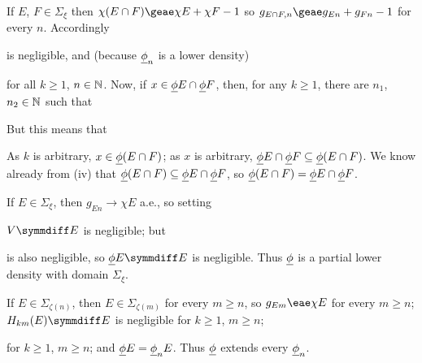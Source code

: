{\medskip

 If $E$, $F\in\Sigma_{\xi}$ then
$\chi(E\cap F)\geae\chi E+\chi F-1$ so
$g_{E\cap F,n}\geae g_{En}+g_{Fn}-1$ for every $n$.   Accordingly


\noindent is negligible, and (because ${\underline{\phi}}_n$ is a lower density)


\noindent for all $k\ge 1$, $n\in\Bbb N$.   Now, if $x\in{\underline{\phi}}
E\cap{\underline{\phi}} F$, then, for any $k\ge 1$, there are $n_1$, $n_2\in\Bbb
N$ such that


\noindent But this means that


\noindent As $k$ is arbitrary, $x\in{\underline{\phi}} (E\cap F)$;  as $x$ is
arbitrary, ${\underline{\phi}} E\cap{\underline{\phi}} F\subseteq{\underline{\phi}}(E\cap F)$.
We know already from (iv) that ${\underline{\phi}}(E\cap F)\subseteq{\underline{\phi}}
E\cap{\underline{\phi}} F$, so ${\underline{\phi}}(E\cap F)={\underline{\phi}} E\cap{\underline{\phi}} F$.

\medskip

 If $E\in\Sigma_{\xi}$, then $g_{En}\to\chi E$ a.e., so
setting


\noindent $V\symmdiff E$ is negligible;  but


\noindent is also negligible, so $\undphi E\symmdiff E$ is negligible.
Thus ${\underline{\phi}}$ is a partial lower density with domain $\Sigma_{\xi}$.

\medskip

  If $E\in\Sigma_{\zeta(n)}$, then
$E\in\Sigma_{\zeta(m)}$ for every $m\ge
n$, so $g_{Em}\eae\chi E$ for every $m\ge n$;  $H_{km}(E)\symmdiff E$ is negligible for $k\ge 1$, $m\ge n$;


\noindent for $k\ge 1$, $m\ge n$; and
${\underline{\phi}} E={\underline{\phi}}_nE$.    Thus ${\underline{\phi}}$ extends every ${\underline{\phi}}_n$.

}
